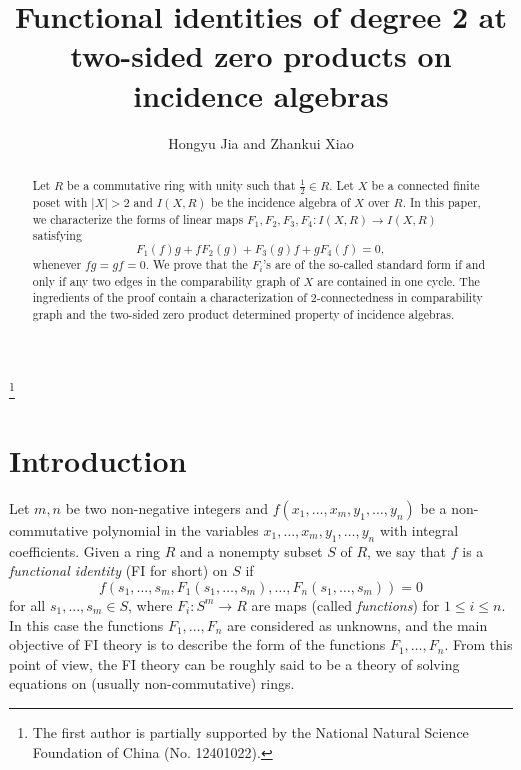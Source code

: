 \documentclass[reqno]{amsart}
\numberwithin{equation}{section}
\theoremstyle{plain}
\theoremstyle{definition}
\begin{document}
\title[FIs on incidence algebras]
{Functional identities of degree 2 at two-sided zero products on incidence algebras}

\author{Hongyu Jia and Zhankui Xiao}

\address{Jia: School of Mathematical Sciences, Huaqiao University,
Quanzhou, Fujian, 362021, P. R. China}

\address{Xiao: School of Mathematical Sciences, Huaqiao University,
Quanzhou, Fujian, 362021, P. R. China}


\begin{abstract}
Let $R$ be a commutative ring with unity such that $\frac{1}{2}\in R$.
Let $X$ be a connected finite poset with $|X|>2$ and $I(X,R)$ be the incidence
algebra of $X$ over $R$. In this paper, we characterize the forms of linear maps
$F_1,F_2,F_3,F_4:I(X,R)\to I(X,R)$ satisfying
\[
F_1(f)g+fF_2(g)+F_3(g)f+gF_4(f)=0,
\]
whenever $fg=gf=0$. We prove that the $F_i$'s are of the so-called standard form
if and only if any two edges in the comparability graph of $X$ are contained in one cycle.
The ingredients of the proof contain a characterization of $2$-connectedness in comparability graph
and the two-sided zero product determined property of incidence
algebras.
\end{abstract}



\thanks{The first author is partially supported by the National Natural Science Foundation of China (No. 12401022).}

\maketitle

\section{Introduction}\label{sec:introduction}

Let $m,n$ be two non-negative integers and
$f(x_1, \ldots, x_m, y_1, \ldots, y_n)$ be
a non-commutative polynomial in the variables $x_1, \ldots, x_m, y_1, \ldots, y_n$
with integral coefficients. Given a ring $R$ and a nonempty subset $S$ of $R$,
we say that $f$ is a {\em functional identity} (FI for short) on $S$ if
$$
f(s_1, \ldots, s_m, F_1(s_1, \ldots, s_m), \ldots, F_n(s_1, \ldots, s_m))=0
$$
for all $s_1, \ldots, s_m\in S$, where $F_i: S^m\rightarrow R$ are maps (called {\em functions}) for $1\leq i\leq n$.
In this case the functions $F_1, \ldots, F_n$ are considered as unknowns, and
the main objective of FI theory is to describe the form of the functions $F_1, \ldots, F_n$.
From this point of view, the FI theory can be roughly said to be a theory of solving equations
on (usually non-commutative) rings.
\end{document}
